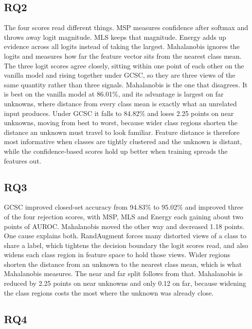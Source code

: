 \documentclass{article}
\begin{document}
\subsection{RQ2}

The four scores read different things. MSP measures confidence after softmax
and throws away logit magnitude. MLS keeps that magnitude. Energy adds up
evidence across all logits instead of taking the largest. Mahalanobis ignores
the logits and measures how far the feature vector sits from the nearest
class mean. The three logit scores agree closely, sitting within one point of
each other on the vanilla model and rising together under GCSC, so they are
three views of the same quantity rather than three signals. Mahalanobis is
the one that disagrees. It is best on the vanilla model at 86.01\%, and its
advantage is largest on far unknowns, where distance from every class mean is
exactly what an unrelated input produces. Under GCSC it falls to 84.82\% and
loses 2.25 points on near unknowns, moving from best to worst, because wider
class regions shorten the distance an unknown must travel to look familiar.
Feature distance is therefore most informative when classes are tightly
clustered and the unknown is distant, while the confidence-based scores hold
up better when training spreads the features out.

\subsection{RQ3}

GCSC improved closed-set accuracy from 94.83\% to 95.02\% and improved three
of the four rejection scores, with MSP, MLS and Energy each gaining about two
points of AUROC. Mahalanobis moved the other way and decreased 1.18 points.
One cause explains both. RandAugment forces many distorted views of a class
to share a label, which tightens the decision boundary the logit scores read,
and also widens each class region in feature space to hold those views. Wider
regions shorten the distance from an unknown to the nearest class mean, which
is what Mahalanobis measures. The near and far split follows from that.
Mahalanobis is reduced by 2.25 points on near unknowns and only 0.12 on far,
because widening the class regions costs the most where the unknown was
already close.

\subsection{RQ4}
\end{document}
